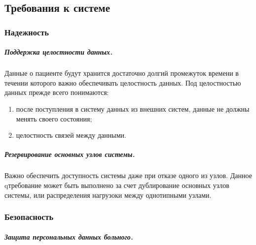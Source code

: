 \subsection{Требования к системе}

\subsubsection{Надежность}
\subparagraph{Поддержка целостности данных.}
Данные о пациенте будут хранится достаточно долгий промежуток времени в течении которого важно обеспечивать целостность данных. Под целостностью данных прежде всего понимаются:

\begin{enumerate}
  \item после поступления в систему данных из внешних систем, данные не должны
  менять своего состояния;
  \item целостность связей между данными. 
\end{enumerate}

\subparagraph{Резервирование основных узлов системы.}
Важно обеспечить доступность системы даже при отказе одного из узлов. Данное
qтребование может быть выполнено за счет дублирование основных узлов системы,
или распределения нагрузоки между однотипными узлами.

\subsubsection{Безопасность}
\subparagraph{Защита персональных данных больного.}

